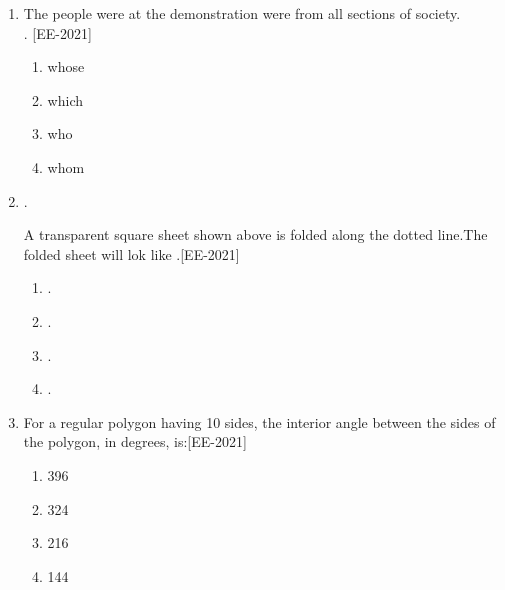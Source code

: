 \documentclass[journal]{IEEEtran}
\begin{document}
\begin{enumerate}
    \item The people \underline{\hspace{2cm}} were at the demonstration were from all sections of society.\\. \hfill{[EE-2021]}
    \begin{enumerate}
        \item whose
        \item which
        \item who
        \item whom
    \end{enumerate}
    \item. 
    \begin{figure}[H] 
    \centering 
     
    \end{figure} 
    A transparent square sheet shown above is folded along the dotted line.The folded sheet will lok like \underline{\hspace{2cm}}.\hfill{[EE-2021]}
          \begin{enumerate}
              \item. 
              \begin{figure}[H] 
              \centering
               
              \end{figure}
\item.
\begin{figure}[H] 
\centering
 
\end{figure}
\item. 
\begin{figure}[H] 
\centering
 
\end{figure}
\item. 
\begin{figure}[H] 
\centering
 
\end{figure}
          \end{enumerate}

           \item For a regular polygon having 10 sides, the interior angle between the sides of the polygon, in degrees, is:\hfill{[EE-2021]}
    \begin{enumerate}
        \item 396
        \item 324
        \item 216
        \item 144
    \end{enumerate}
    

\end{enumerate}
\end{document}
